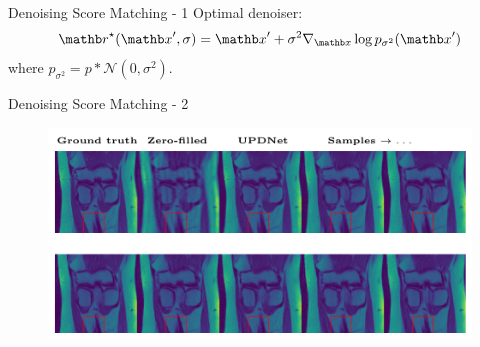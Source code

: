 \begin{frame}{Denoising Score Matching - 1}
    Optimal denoiser:
    \begin{equation*}
        \rb^\star(\xb', \sigma) = \xb' + \sigma^2 \nabla_{\xb} \log p_{\sigma^2}(\xb')
    \end{equation*}
    where $p_{\sigma^2} = p \ast \mathcal{N}(0, \sigma^2)$.
\end{frame}

\begin{frame}{Denoising Score Matching - 2}
    \begin{figure}
        \centering
        \includegraphics[width=\textwidth]{Figures/clinic_applic/dsm_main.pdf}
    \end{figure}

\end{frame}
